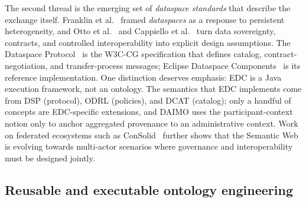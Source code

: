 \documentclass[Afour,sagev,times]{sagej}
\begin{document}
The second thread is the emerging set of \emph{dataspace standards} that describe the exchange itself. Franklin et al.~\cite{franklin05} framed \emph{dataspaces} as a response to persistent heterogeneity, and Otto et al.~\cite{otto19} and Cappiello et al.~\cite{cappiello22} turn data sovereignty, contracts, and controlled interoperability into explicit design assumptions. The Dataspace Protocol~\cite{dsp} is the W3C-CG specification that defines catalog, contract-negotiation, and transfer-process messages; Eclipse Dataspace Components~\cite{edc} is its reference implementation. One distinction deserves emphasis: EDC is a Java execution framework, not an ontology. The semantics that EDC implements come from DSP (protocol), ODRL (policies), and DCAT (catalog); only a handful of concepts are EDC-specific extensions, and DAIMO uses the participant-context notion only to anchor aggregated provenance to an administrative context. Work on federated ecosystems such as ConSolid~\cite{werbrouck24} further shows that the Semantic Web is evolving towards multi-actor scenarios where governance and interoperability must be designed jointly.

\subsection{Reusable and executable ontology engineering}
\end{document}
